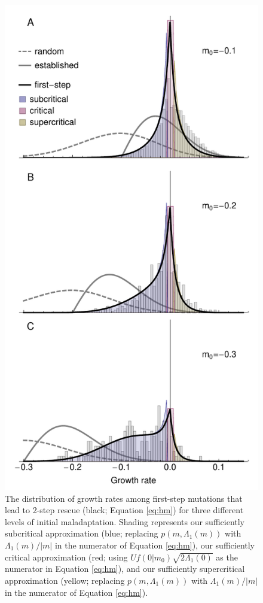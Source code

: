 \documentclass[9pt,twocolumn,twoside,lineno]{gsajnl}
\begin{document}
\begin{figure}[htbp]
\centering
\includegraphics[width=\linewidth]{Figure7.pdf}
\caption{
The distribution of growth rates among first-step mutations that lead to 2-step rescue (black; Equation \ref{eq:hm}) for three different levels of initial maladaptation.
Shading represents our sufficiently subcritical approximation (blue; replacing $p(m,\Lambda_1(m))$ with $\Lambda_1(m)/|m|$ in the numerator of Equation \ref{eq:hm}), our sufficiently critical approximation (red; using $U f(0|m_0) \sqrt{2 \Lambda_1(0)}$ as the numerator in Equation \ref{eq:hm}), and our sufficiently supercritical approximation (yellow; replacing $p(m,\Lambda_1(m))$ with $\Lambda_1(m)/|m|$ in the numerator of Equation \ref{eq:hm}).
}
\end{figure}
\end{document}
